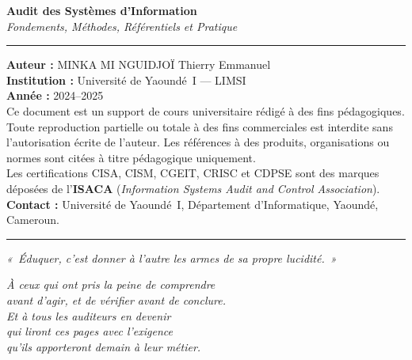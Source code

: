 \documentclass[12pt, a4paper, twoside, openright]{book}
\begin{document}
\begin{center}
    \begin{minipage}{0.78\textwidth}
        \footnotesize\color{CouleurBordInfo}
        \begin{center}
            {\bfseries\color{CouleurPrimaire}
                Audit des Systèmes d'Information}\\[0.4ex]
            {\itshape Fondements, Méthodes, Référentiels et Pratique}
        \end{center}
        \vspace{0.8ex}
        \hrule
        \vspace{0.8ex}
        \textbf{Auteur :} MINKA MI NGUIDJOÏ Thierry Emmanuel\\
        \textbf{Institution :} Université de Yaoundé~I — LIMSI\\
        \textbf{Année :} 2024--2025\\[0.5ex]
        Ce document est un support de cours universitaire rédigé à des fins
        pédagogiques. Toute reproduction partielle ou totale à des fins commerciales
        est interdite sans l'autorisation écrite de l'auteur. Les références à des
        produits, organisations ou normes sont citées à titre pédagogique uniquement.\\[0.5ex]
        Les certifications CISA, CISM, CGEIT, CRISC et CDPSE sont des marques
        déposées de l'\textbf{ISACA} (\textit{Information Systems Audit and Control Association}).\\[0.5ex]
        \textbf{Contact :} Université de Yaoundé~I, Département d'Informatique,
        Yaoundé, Cameroun.\\[0.8ex]
        \hrule
        \vspace{0.5ex}
        {\centering\itshape
        «~Éduquer, c'est donner à l'autre les armes de sa propre lucidité.~»}
    \end{minipage}
\end{center}

\vspace*{\fill}

\clearpage
\thispagestyle{empty}
\vspace*{3cm}
\begin{flushright}
    \begin{minipage}{0.6\textwidth}
        \itshape\large\color{CouleurPrimaire}
        À ceux qui ont pris la peine de comprendre\\
        avant d'agir, et de vérifier avant de conclure.\\[1.5ex]
        \normalsize\normalfont\color{CouleurAccent}
        Et à tous les auditeurs en devenir\\
        qui liront ces pages avec l'exigence\\
        qu'ils apporteront demain à leur métier.
    \end{minipage}
\end{flushright}
\end{document}
